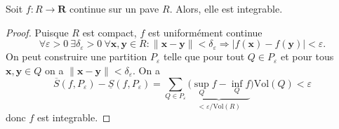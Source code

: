 \begin{theorem}
Soit $f:R\to \mathbf{R}$ continue sur un pave $R$. Alors, elle est integrable.
\end{theorem}
\begin{proof}
Puisque $R$ est compact, $f$ est uniformément continue
$$
\forall\varepsilon>0 ~\exists\delta _{\varepsilon}>0~\forall \boldsymbol{x},\boldsymbol{y}\in R: \lVert \boldsymbol{x}-\boldsymbol{y} \rVert <\delta _{\varepsilon}\Rightarrow |f(\boldsymbol{x})-f(\boldsymbol{y})|<\varepsilon.
$$
On peut construire une partition $P_{\varepsilon}$ telle que pour tout $Q\in P_{\varepsilon}$ et pour tous $\boldsymbol{x},\boldsymbol{y}\in Q$ on a $\lVert \boldsymbol{x}-\boldsymbol{y} \rVert<\delta _{\varepsilon}$. On a 
$$
\overline{S}(f,P_{\varepsilon})-\underline{S}(f,P_{\varepsilon})=\sum _{Q\in P_{\varepsilon}} \underbrace{ (\sup_{Q}f - \inf_{Q}f }_{ <\varepsilon /\mathrm{Vol}(R) })\mathrm{Vol}(Q)<\varepsilon
$$
donc $f$ est integrable.
\end{proof}